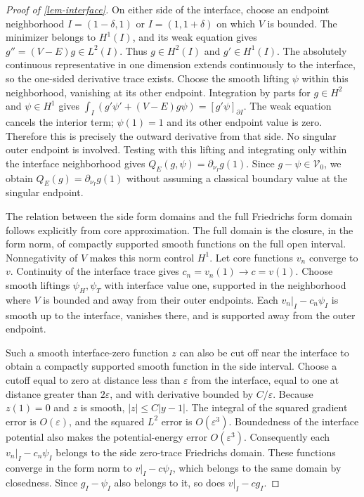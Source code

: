\documentclass[11pt,a4paper]{article}
\theoremstyle{proofmanuscript}
\begin{document}
\begin{proof}[Proof of \ref{lem-interface}]
On either side of the interface, choose an endpoint neighborhood \(I=(1-\delta,1)\) or \(I=(1,1+\delta)\) on which \(V\) is bounded. The minimizer belongs to \(H^1(I)\), and its weak equation gives \(g''=(V-E)g\in L^2(I)\). Thus \(g\in H^2(I)\) and \(g'\in H^1(I)\). The absolutely continuous representative in one dimension extends continuously to the interface, so the one-sided derivative trace exists. Choose the smooth lifting \(\psi\) within this neighborhood, vanishing at its other endpoint. Integration by parts for \(g\in H^2\) and \(\psi\in H^1\) gives \(\int_I(g'\psi'+(V-E)g\psi)=[g'\psi]_{\partial I}\). The weak equation cancels the interior term; \(\psi(1)=1\) and its other endpoint value is zero. Therefore this is precisely the outward derivative from that side. No singular outer endpoint is involved. Testing with this lifting and integrating only within the interface neighborhood gives \(Q_E(g,\psi)=\partial_{\nu_I}g(1)\). Since \(g-\psi\in\mathcal V_0\), we obtain \(Q_E(g)=\partial_{\nu_I}g(1)\) without assuming a classical boundary value at the singular endpoint.

The relation between the side form domains and the full Friedrichs form domain follows explicitly from core approximation. The full domain is the closure, in the form norm, of compactly supported smooth functions on the full open interval. Nonnegativity of \(V\) makes this norm control \(H^1\). Let core functions \(v_n\) converge to \(v\). Continuity of the interface trace gives \(c_n=v_n(1)\to c=v(1)\). Choose smooth liftings \(\psi_H,\psi_T\) with interface value one, supported in the neighborhood where \(V\) is bounded and away from their outer endpoints. Each \(v_n|_I-c_n\psi_I\) is smooth up to the interface, vanishes there, and is supported away from the outer endpoint.

Such a smooth interface-zero function \(z\) can also be cut off near the interface to obtain a compactly supported smooth function in the side interval. Choose a cutoff equal to zero at distance less than \(\varepsilon\) from the interface, equal to one at distance greater than \(2\varepsilon\), and with derivative bounded by \(C/\varepsilon\). Because \(z(1)=0\) and \(z\) is smooth, \(|z|\le C|y-1|\). The integral of the squared gradient error is \(O(\varepsilon)\), and the squared \(L^2\) error is \(O(\varepsilon^3)\). Boundedness of the interface potential also makes the potential-energy error \(O(\varepsilon^3)\). Consequently each \(v_n|_I-c_n\psi_I\) belongs to the side zero-trace Friedrichs domain. These functions converge in the form norm to \(v|_I-c\psi_I\), which belongs to the same domain by closedness. Since \(g_I-\psi_I\) also belongs to it, so does \(v|_I-cg_I\).


\end{proof}
\end{document}
